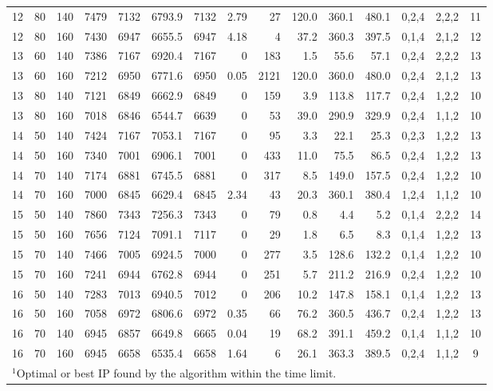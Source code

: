 \documentclass[11pt]{article}
\begin{document}
\begin{table}[h!tbp]
{\begin {tabular}[t]{|c|c|c|c|c|c|c|r|r|r|r|r|c|c|c|}
12 & 80	& 140	& 7479	& 7132	& 6793.9 & 7132	& 2.79	& 27	& 120.0	& 360.1	& 480.1	& 0,2,4	& 2,2,2	& 11	\\
12 & 80	& 160	& 7430	& 6947	& 6655.5 & 6947	& 4.18	& 4	& 37.2	& 360.3	& 397.5	& 0,1,4	& 2,1,2	& 12	\\\hline
13 & 60	& 140	& 7386	& 7167	& 6920.4 & 7167	& 0	& 183	& 1.5	& 55.6	& 57.1	& 0,2,4	& 2,2,2	& 13	\\
13 & 60	& 160	& 7212	& 6950	& 6771.6 & 6950	& 0.05	& 2121	& 120.0	& 360.0	& 480.0	& 0,2,4	& 2,1,2	& 13	\\
13 & 80	& 140	& 7121	& 6849	& 6662.9 & 6849	& 0	& 159	& 3.9	& 113.8	& 117.7	& 0,2,4	& 1,2,2	& 10	\\
13 & 80	& 160	& 7018	& 6846	& 6544.7 & 6639	& 0	& 53	& 39.0	& 290.9	& 329.9	& 0,2,4	& 1,1,2	& 10	\\\hline
14 & 50	& 140	& 7424	& 7167	& 7053.1 & 7167	& 0	& 95	& 3.3	& 22.1	& 25.3	& 0,2,3	& 1,2,2	& 13	\\
14 & 50	& 160	& 7340	& 7001	& 6906.1 & 7001	& 0	& 433	&11.0	& 75.5	& 86.5	& 0,2,4	& 1,2,2	& 13	\\
14 & 70	& 140	& 7174	& 6881	& 6745.5 & 6881	& 0	& 317	& 8.5	& 149.0	& 157.5	& 0,2,4	& 1,2,2	& 10	\\
14 & 70	& 160	& 7000	& 6845	& 6629.4 & 6845	& 2.34	& 43	& 20.3	& 360.1	& 380.4	& 1,2,4	& 1,1,2	& 10	\\\hline
15 & 50	& 140	& 7860	& 7343	& 7256.3 & 7343	& 0	& 79	& 0.8	& 4.4	& 5.2	& 0,1,4	& 2,2,2	& 14	\\
15 & 50	& 160	& 7656	& 7124	& 7091.1 & 7117	& 0	& 29	& 1.8	& 6.5	& 8.3	& 0,1,4	& 1,2,2	& 13	\\
15 & 70	& 140	& 7466	& 7005	& 6924.5 & 7000	& 0	& 277	& 3.5	& 128.6	& 132.2	& 0,1,4	& 1,2,2	& 10	\\
15 & 70	& 160	& 7241	& 6944	& 6762.8 & 6944	& 0	& 251	& 5.7	& 211.2	& 216.9	& 0,2,4	& 1,2,2	& 10	\\\hline
16 & 50	& 140	& 7283	& 7013	& 6940.5 & 7012	& 0	& 206	& 10.2	& 147.8	& 158.1	& 0,1,4	& 1,2,2	& 13	\\
16 & 50	& 160	& 7058	& 6972	& 6806.6 & 6972	& 0.35	& 66	& 76.2	& 360.5	& 436.7	& 0,2,4	& 1,2,2	& 13	\\
16 & 70	& 140	& 6945	& 6857	& 6649.8 & 6665	& 0.04	& 19	& 68.2	& 391.1	& 459.2	& 0,1,4	& 1,1,2	& 10	\\
16 & 70	& 160	& 6945	& 6658	& 6535.4 & 6658	& 1.64 & 6	& 26.1	& 363.3	& 389.5	& 0,2,4	& 1,1,2	& 9	\\\hline
\multicolumn{15}{l}{$^1$Optimal or best IP found by the algorithm within the time limit.}\\
\end{tabular}}
\end{table} 
\end{document}
